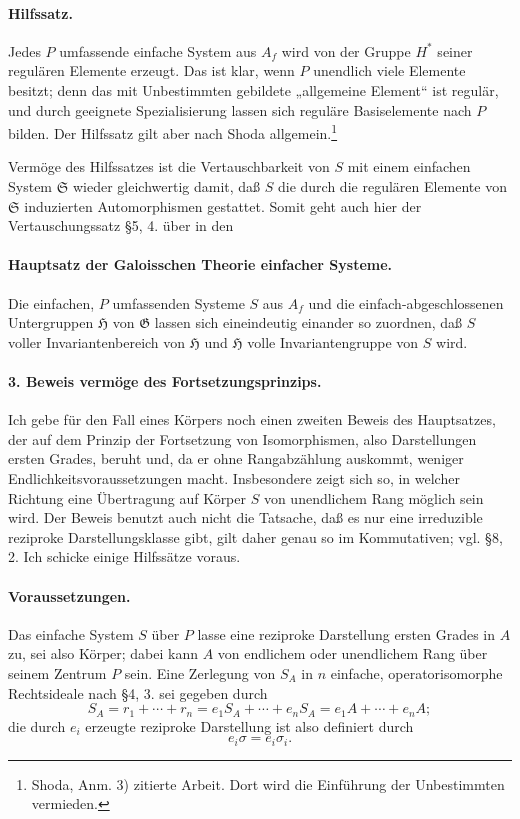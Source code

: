 \documentclass[11pt]{article}
\providecommand{\Gcal}{\mathfrak G}
\begin{document}
\paragraph{Hilfssatz.}
Jedes \(P\) umfassende einfache System aus \(A_f\) wird von der Gruppe \(H^*\) seiner regulären Elemente erzeugt. Das ist klar, wenn \(P\) unendlich viele Elemente besitzt; denn das mit Unbestimmten gebildete „allgemeine Element“ ist regulär, und durch geeignete Spezialisierung lassen sich reguläre Basiselemente nach \(P\) bilden. Der Hilfssatz gilt aber nach Shoda allgemein.\footnote{Shoda, Anm. 3) zitierte Arbeit. Dort wird die Einführung der Unbestimmten vermieden.}

Vermöge des Hilfssatzes ist die Vertauschbarkeit von \(S\) mit einem einfachen System \(\mathfrak S\) wieder gleichwertig damit, daß \(S\) die durch die regulären Elemente von \(\mathfrak S\) induzierten Automorphismen gestattet. Somit geht auch hier der Vertauschungssatz §5, 4. über in den

\paragraph{Hauptsatz der Galoisschen Theorie einfacher Systeme.}
Die einfachen, \(P\) umfassenden Systeme \(S\) aus \(A_f\) und die einfach-abgeschlossenen Untergruppen \(\mathfrak H\) von \(\Gcal\) lassen sich eineindeutig einander so zuordnen, daß \(S\) voller Invariantenbereich von \(\mathfrak H\) und \(\mathfrak H\) volle Invariantengruppe von \(S\) wird.

\paragraph{3. Beweis vermöge des Fortsetzungsprinzips.}
Ich gebe für den Fall eines Körpers noch einen zweiten Beweis des Hauptsatzes, der auf dem Prinzip der Fortsetzung von Isomorphismen, also Darstellungen ersten Grades, beruht und, da er ohne Rangabzählung auskommt, weniger Endlichkeitsvoraussetzungen macht. Insbesondere zeigt sich so, in welcher Richtung eine Übertragung auf Körper \(S\) von unendlichem Rang möglich sein wird. Der Beweis benutzt auch nicht die Tatsache, daß es nur eine irreduzible reziproke Darstellungsklasse gibt, gilt daher genau so im Kommutativen; vgl. §8, 2. Ich schicke einige Hilfssätze voraus.

\paragraph{Voraussetzungen.}
Das einfache System \(S\) über \(P\) lasse eine reziproke Darstellung ersten Grades in \(A\) zu, sei also Körper; dabei kann \(A\) von endlichem oder unendlichem Rang über seinem Zentrum \(P\) sein. Eine Zerlegung von \(S_A\) in \(n\) einfache, operatorisomorphe Rechtsideale nach §4, 3. sei gegeben durch
\[
        S_A=r_1+\cdots+r_n
            =e_1S_A+\cdots+e_nS_A
            =e_1A+\cdots+e_nA ;
\]
die durch \(e_i\) erzeugte reziproke Darstellung ist also definiert durch
\[
        e_i\sigma=e_i\sigma_i .
\]
\end{document}
